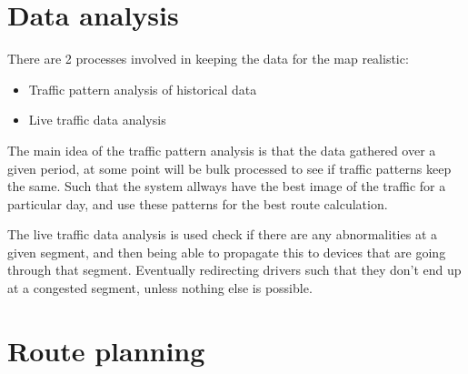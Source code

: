 \section{Data analysis}
There are 2 processes involved in keeping the data for the map realistic:
\begin{itemize}
	\item Traffic pattern analysis of historical data
	\item Live traffic data analysis
\end{itemize}

The main idea of the traffic pattern analysis is that the data gathered over a given period, at some point will be bulk processed to see if traffic patterns keep the same. Such that the system allways have the best image of the traffic for a particular day, and use these patterns for the best route calculation.

The live traffic data analysis is used check if there are any abnormalities at a given segment, and then being able to propagate this to devices that are going through that segment. Eventually redirecting drivers such that they don't end up at a congested segment, unless nothing else is possible.
\section{Route planning}
